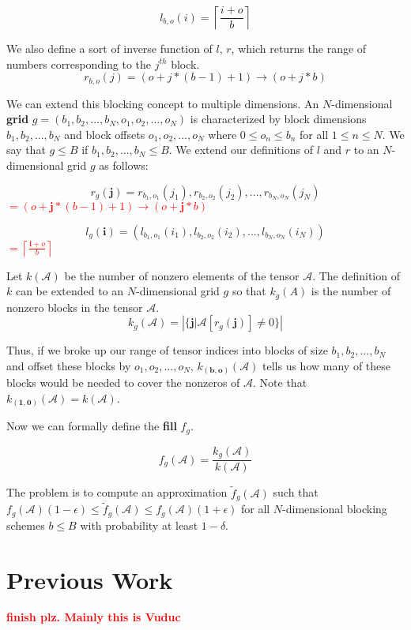 \documentclass[12pt]{article}
\theoremstyle{dfn}
\numberwithin{equation}{section}
\numberwithin{figure}{section}
\newcommand{\todo}[1] {\textbf{\textcolor{red}{#1}}}
\renewcommand{\vec}[1] {\mathbf{#1}}
\newcommand{\Ten}[1] {\mathbf{\mathcal{#1}}}
\begin{document}
    \[
      l_{b, o}(i) = \left\lceil\frac{i + o}{b}\right\rceil
    \]

    We also define a sort of inverse function of $l$, $r$, which returns the range of numbers corresponding to the $j^{th}$ block.
    \[
      r_{b, o}(j) = (o + j * (b - 1) + 1) \to (o + j * b)
    \]

    We can extend this blocking concept to multiple dimensions. An $N$-dimensional \textbf{grid} $g = (b_1, b_2, ..., b_N, o_1, o_2, ..., o_N)$ is characterized by block dimensions $b_1, b_2, ..., b_N$ and block offsets $o_1, o_2, ..., o_N$ where $0 \leq o_n \leq b_n$ for all $1 \leq n \leq N$. We say that $g \leq B$ if $b_1, b_2, ..., b_N \leq B$. We extend our definitions of $l$ and $r$ to an $N$-dimensional grid $g$ as follows:

    \[
      r_g(\vec{j}) = r_{b_1, o_1}(j_1), r_{b_2, o_2}(j_2), ..., r_{b_N, o_N}(j_N)
    \]\todo{$ = (o + \vec{j} * (b - 1) + 1) \to (o + \vec{j} * b)$}

    \[
      l_g(\vec{i}) = (l_{b_1, o_1}(i_1), l_{b_2, o_2}(i_2), ..., l_{b_N, o_N}(i_N))
    \]\todo{$ = \left\lceil\frac{\vec{i} + o}{b}\right\rceil$}

    Let $k(\Ten{A})$ be the number of nonzero elements of the tensor $\Ten{A}$. The definition of $k$ can be extended to an $N$-dimensional grid $g$ so that $k_g(A)$ is the number of nonzero blocks in the tensor $\Ten{A}$.
    \[
      k_g(\Ten{A}) = \left|\{\vec{j} | \Ten{A}[r_g(\vec{j})] \neq 0\}\right|
    \]

    Thus, if we broke up our range of tensor indices into blocks of size $b_1, b_2, ..., b_N$ and offset these blocks by $o_1, o_2, ..., o_N$, $k_{(\vec{b}, \vec{o})}(\Ten{A})$ tells us how many of these blocks would be needed to cover the nonzeros of $\Ten{A}$. Note that $k_{(\vec{1}, \vec{0})}(\Ten{A}) = k(\Ten{A})$.

    Now we can formally define the \textbf{fill} $f_g$.

    \[
      f_g(\Ten{A}) = \frac{k_g(\Ten{A})}{k(\Ten{A})}
    \]

    The problem is to compute an approximation $\tilde{f}_g(\Ten{A})$ such that $f_g(\Ten{A})(1 - \epsilon) \leq \tilde{f}_g(\Ten{A}) \leq f_g(\Ten{A})(1 + \epsilon)$ for all $N$-dimensional blocking schemes $b \leq B$ with probability at least $1 - \delta$.
  \section{Previous Work}
    \todo{finish plz. Mainly this is Vuduc}
\end{document}
